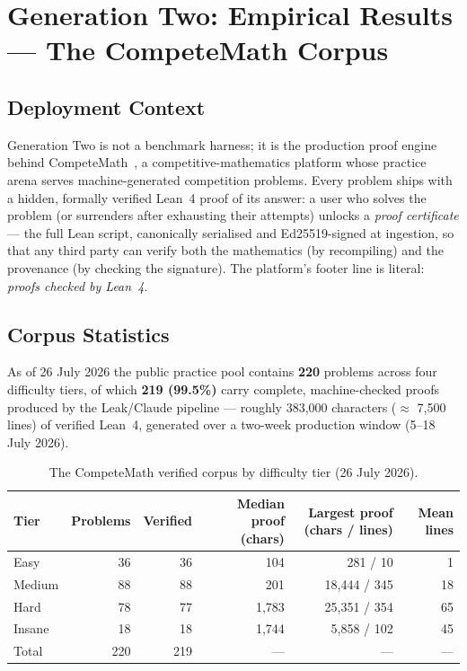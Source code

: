 \documentclass[12pt, a4paper]{article}
\begin{document}
\section{Generation Two: Empirical Results --- The CompeteMath Corpus}
\label{sec:gen2-results}

\subsection{Deployment Context}

Generation Two is not a benchmark harness; it is the production proof engine
behind CompeteMath~\cite{competemath}, a competitive-mathematics
platform whose practice arena serves machine-generated competition problems.
Every problem ships with a hidden, formally verified Lean~4 proof of its
answer: a user who solves the problem (or surrenders after exhausting their
attempts) unlocks a \emph{proof certificate} --- the full Lean script,
canonically serialised and Ed25519-signed at ingestion, so that any third
party can verify both the mathematics (by recompiling) and the provenance
(by checking the signature). The platform's footer line is literal:
\emph{proofs checked by Lean~4}.

\subsection{Corpus Statistics}

As of 26 July 2026 the public practice pool contains \textbf{220} problems
across four difficulty tiers, of which \textbf{219 (99.5\%)} carry complete,
machine-checked proofs produced by the Leak/Claude pipeline --- roughly
383{,}000 characters ($\approx$ 7{,}500 lines) of verified Lean~4, generated
over a two-week production window (5--18 July 2026).

\begin{table}[H]
  \centering
  \caption{The CompeteMath verified corpus by difficulty tier (26 July 2026).}
  \label{tab:corpus}
  \renewcommand{\arraystretch}{1.4}
  \begin{tabular}{lrrrrr}
    \toprule
    Tier & Problems & Verified & Median proof (chars) & Largest proof (chars / lines) & Mean lines \\
    \midrule
    Easy   & 36 & 36 & 104   & 281 / 10        & 1  \\
    Medium & 88 & 88 & 201   & 18{,}444 / 345  & 18 \\
    Hard   & 78 & 77 & 1{,}783 & 25{,}351 / 354 & 65 \\
    Insane & 18 & 18 & 1{,}744 & 5{,}858 / 102  & 45 \\
    \midrule
    Total  & 220 & 219 & --- & --- & --- \\
    \bottomrule
  \end{tabular}
\end{table}
\end{document}
